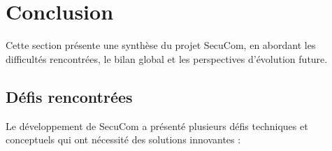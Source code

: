 \chapter*{Conclusion}

Cette section présente une synthèse du projet SecuCom, en abordant les difficultés rencontrées, le bilan global et les perspectives d'évolution future.

\section*{Défis rencontrées}

Le développement de SecuCom a présenté plusieurs défis techniques et conceptuels qui ont nécessité des solutions innovantes :

